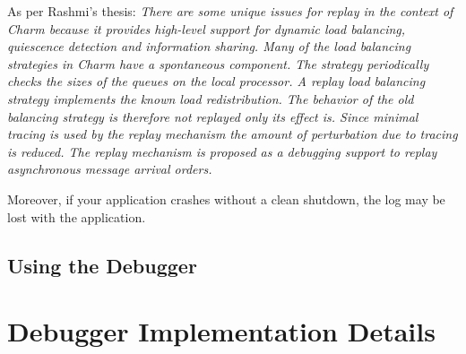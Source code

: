 \documentclass[10pt]{article}
\begin{document}
As per Rashmi's thesis: \textit{ There are some unique issues for
replay in the context of Charm because it provides high-level support
for dynamic load balancing, quiescence detection and information
sharing. Many of the load balancing strategies in Charm have a
spontaneous component. The strategy periodically checks the sizes of
the queues on the local processor. A replay load balancing strategy
implements the known load redistribution. The behavior of the old
balancing strategy is therefore not replayed only its effect is. Since
minimal tracing is used by the replay mechanism the amount of
perturbation due to tracing is reduced. The replay mechanism is
proposed as a debugging support to replay asynchronous message arrival
orders.}

Moreover, if your application crashes without a clean shutdown, the log may be
lost with the application.

\subsection{Using the Debugger}
\label{sec:using}



\section{Debugger Implementation Details}
\label{sec:implementation}

\end{document}
